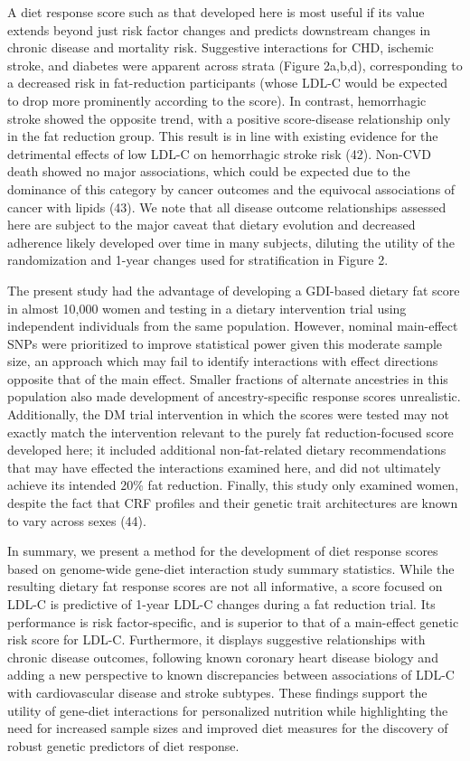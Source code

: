 \documentclass[]{article}
\begin{document}
A diet response score such as that developed here is most useful if its
value extends beyond just risk factor changes and predicts downstream
changes in chronic disease and mortality risk. Suggestive interactions
for CHD, ischemic stroke, and diabetes were apparent across strata
(Figure 2a,b,d), corresponding to a decreased risk in fat-reduction
participants (whose LDL-C would be expected to drop more prominently
according to the score). In contrast, hemorrhagic stroke showed the
opposite trend, with a positive score-disease relationship only in the
fat reduction group. This result is in line with existing evidence for
the detrimental effects of low LDL-C on hemorrhagic stroke risk (42).
Non-CVD death showed no major associations, which could be expected due
to the dominance of this category by cancer outcomes and the equivocal
associations of cancer with lipids (43). We note that all disease
outcome relationships assessed here are subject to the major caveat that
dietary evolution and decreased adherence likely developed over time in
many subjects, diluting the utility of the randomization and 1-year
changes used for stratification in Figure 2.

The present study had the advantage of developing a GDI-based dietary
fat score in almost 10,000 women and testing in a dietary intervention
trial using independent individuals from the same population. However,
nominal main-effect SNPs were prioritized to improve statistical power
given this moderate sample size, an approach which may fail to identify
interactions with effect directions opposite that of the main effect.
Smaller fractions of alternate ancestries in this population also made
development of ancestry-specific response scores unrealistic.
Additionally, the DM trial intervention in which the scores were tested
may not exactly match the intervention relevant to the purely fat
reduction-focused score developed here; it included additional
non-fat-related dietary recommendations that may have effected the
interactions examined here, and did not ultimately achieve its intended
20\% fat reduction. Finally, this study only examined women, despite the
fact that CRF profiles and their genetic trait architectures are known
to vary across sexes (44).

In summary, we present a method for the development of diet response
scores based on genome-wide gene-diet interaction study summary
statistics. While the resulting dietary fat response scores are not all
informative, a score focused on LDL-C is predictive of 1-year LDL-C
changes during a fat reduction trial. Its performance is risk
factor-specific, and is superior to that of a main-effect genetic risk
score for LDL-C. Furthermore, it displays suggestive relationships with
chronic disease outcomes, following known coronary heart disease biology
and adding a new perspective to known discrepancies between associations
of LDL-C with cardiovascular disease and stroke subtypes. These findings
support the utility of gene-diet interactions for personalized nutrition
while highlighting the need for increased sample sizes and improved diet
measures for the discovery of robust genetic predictors of diet
response.
\end{document}
